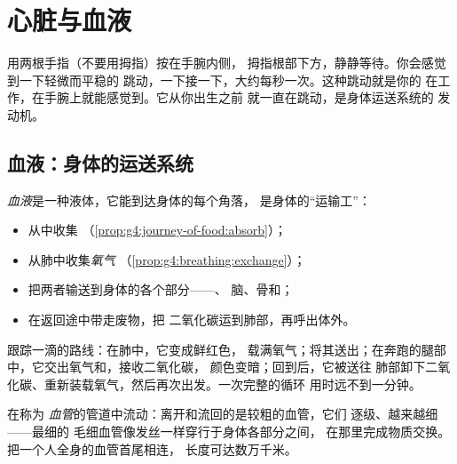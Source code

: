 \chapter{心脏与血液}\label{ch:g4:heart-and-blood}

用两根手指（不要用拇指）按在手腕内侧，
拇指根部下方，静静等待。你会感觉到一下轻微而平稳的
跳动，一下接一下，大约每秒一次。这种跳动就是你的
在工作，在手腕上就能感觉到。它从你出生之前
就一直在跳动，是身体运送系统的
发动机。

\section{血液：身体的运送系统}

\begin{proposition}[血液携带的物质]\label{prop:g4:heart-and-blood:carries}
\emph{血液}是一种液体，它能到达身体的每个角落，
是身体的“运输工”：
\begin{itemize}
  \item 从中收集
        \emph{}（\cref{prop:g4:journey-of-food:absorb}）；
  \item 从肺中收集\emph{氧气}
        （\cref{prop:g4:breathing:exchange}）；
  \item 把两者输送到身体的各个部分——、
        脑、骨和；
  \item 在返回途中带走废物，把
        二氧化碳运到肺部，再呼出体外。
\end{itemize}
\end{proposition}
\admitted

\begin{example}[一次运送的过程]\label{ex:g4:heart-and-blood:round}
跟踪一滴的路线：在肺中，它变成鲜红色，
载满氧气；将其送出；在奔跑的腿部
中，它交出氧气和，接收二氧化碳，
颜色变暗；回到后，它被送往
肺部卸下二氧化碳、重新装载氧气，然后再次出发。一次完整的循环
用时远不到一分钟。
\end{example}

\begin{definition}[血管]\label{def:g4:heart-and-blood:vessels}
在称为
\emph{血管}的管道中流动：离开和流回的是较粗的血管，它们
逐级、越来越细——最细的
毛细血管像发丝一样穿行于身体各部分之间，
在那里完成物质交换。把一个人全身的血管首尾相连，
长度可达数万千米。
\end{definition}

